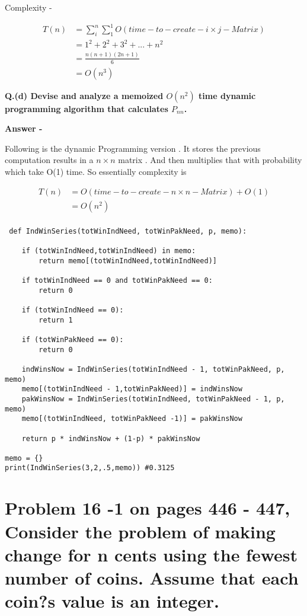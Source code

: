 \documentclass[5pt]{article}
\begin{document}
Complexity -

\begin{align*}
T(n) & = \sum_{i}^{n} \sum_{1}^{1} O(time-to-create- i \times j - Matrix ) \\
& = 1^2 + 2^2 + 3^2 + ... + n^2  \\
& =  \frac {n (n+1) (2n+1)} 6 \\
& = O(n^3) 
\end{align*}

 
\textbf{Q.(d) Devise and analyze a memoized $O(n^2)$ time dynamic programming algorithm that calculates $P_{nn}$.}

\setlength{\parskip}{1.2em}
\setlength{\parindent}{0em}

\textbf{Answer -}

Following is the dynamic Programming version . It stores the previous computation results in a $n \times n$ matrix . And then multiplies that with probability which take O(1) time. So essentially complexity is 

\begin{align*}
T(n) & = O(time-to-create- n \times n - Matrix ) + O(1)\\
& = O(n^2) \\
\end{align*}


\begin{lstlisting}
 def IndWinSeries(totWinIndNeed, totWinPakNeed, p, memo):

    if (totWinIndNeed,totWinIndNeed) in memo:
        return memo[(totWinIndNeed,totWinIndNeed)]

    if totWinIndNeed == 0 and totWinPakNeed == 0:
        return 0

    if (totWinIndNeed == 0):
        return 1

    if (totWinPakNeed == 0):
        return 0

    indWinsNow = IndWinSeries(totWinIndNeed - 1, totWinPakNeed, p, memo)
    memo[(totWinIndNeed - 1,totWinPakNeed)] = indWinsNow
    pakWinsNow = IndWinSeries(totWinIndNeed, totWinPakNeed - 1, p, memo)
    memo[(totWinIndNeed, totWinPakNeed -1)] = pakWinsNow
    
    return p * indWinsNow + (1-p) * pakWinsNow

memo = {}
print(IndWinSeries(3,2,.5,memo)) #0.3125

\end{lstlisting}
 
  \section{Problem 16 -1 on pages 446 - 447, Consider the problem of making change for n cents using the fewest number of coins. Assume that each coin?s value is an integer.}
 
\end{document}

